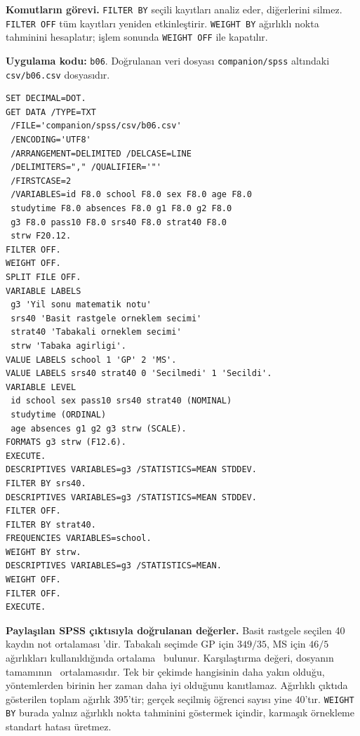 {\raggedright
\noindent\textbf{Komutların görevi.} \texttt{FILTER BY} seçili kayıtları analiz eder, diğerlerini silmez. \texttt{FILTER OFF} tüm kayıtları yeniden etkinleştirir. \texttt{WEIGHT BY} ağırlıklı nokta tahminini hesaplatır; işlem sonunda \texttt{WEIGHT OFF} ile kapatılır.\par}

\textbf{Uygulama kodu:} \texttt{b06}. Doğrulanan veri dosyası
\texttt{companion/spss} altındaki \texttt{csv/b06.csv} dosyasıdır.

\begin{lstlisting}[style=prismSPSS]
SET DECIMAL=DOT.
GET DATA /TYPE=TXT
 /FILE='companion/spss/csv/b06.csv'
 /ENCODING='UTF8'
 /ARRANGEMENT=DELIMITED /DELCASE=LINE
 /DELIMITERS="," /QUALIFIER='"'
 /FIRSTCASE=2
 /VARIABLES=id F8.0 school F8.0 sex F8.0 age F8.0
 studytime F8.0 absences F8.0 g1 F8.0 g2 F8.0
 g3 F8.0 pass10 F8.0 srs40 F8.0 strat40 F8.0
 strw F20.12.
FILTER OFF.
WEIGHT OFF.
SPLIT FILE OFF.
VARIABLE LABELS
 g3 'Yil sonu matematik notu'
 srs40 'Basit rastgele orneklem secimi'
 strat40 'Tabakali orneklem secimi'
 strw 'Tabaka agirligi'.
VALUE LABELS school 1 'GP' 2 'MS'.
VALUE LABELS srs40 strat40 0 'Secilmedi' 1 'Secildi'.
VARIABLE LEVEL
 id school sex pass10 srs40 strat40 (NOMINAL)
 studytime (ORDINAL)
 age absences g1 g2 g3 strw (SCALE).
FORMATS g3 strw (F12.6).
EXECUTE.
DESCRIPTIVES VARIABLES=g3 /STATISTICS=MEAN STDDEV.
FILTER BY srs40.
DESCRIPTIVES VARIABLES=g3 /STATISTICS=MEAN STDDEV.
FILTER OFF.
FILTER BY strat40.
FREQUENCIES VARIABLES=school.
WEIGHT BY strw.
DESCRIPTIVES VARIABLES=g3 /STATISTICS=MEAN.
WEIGHT OFF.
FILTER OFF.
EXECUTE.
\end{lstlisting}

\begin{outputguidebox}
\textbf{Paylaşılan SPSS çıktısıyla doğrulanan değerler.}
Basit rastgele seçilen 40 kaydın not ortalaması \SPSrsMean'dir.
Tabakalı seçimde GP için $349/35$, MS için $46/5$ ağırlıkları kullanıldığında
ortalama \SPStratMean\ bulunur. Karşılaştırma değeri, dosyanın tamamının
\SPMatMean\ ortalamasıdır. Tek bir çekimde hangisinin daha yakın olduğu,
yöntemlerden birinin her zaman daha iyi olduğunu kanıtlamaz.
Ağırlıklı çıktıda gösterilen toplam ağırlık 395'tir; gerçek seçilmiş
öğrenci sayısı yine 40'tır. \texttt{WEIGHT BY} burada yalnız ağırlıklı nokta
tahminini göstermek içindir, karmaşık örnekleme standart hatası üretmez.
\end{outputguidebox}


